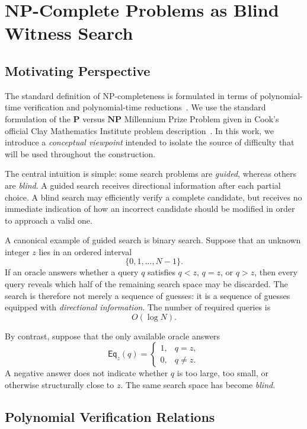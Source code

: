 \documentclass[11pt]{article}
\theoremstyle{plain}
\theoremstyle{definition}
\begin{document}
\section{NP-Complete Problems as Blind Witness Search}
\label{sec:blind-witness-search}

\subsection{Motivating Perspective}

The standard definition of NP-completeness is formulated in terms of
polynomial-time verification and polynomial-time reductions~\cite{Cook1971,Karp1972}.  We use the standard formulation of the $\mathbf{P}$ versus $\mathbf{NP}$ Millennium Prize Problem given in Cook's official Clay Mathematics Institute problem description~\cite{CookClayPvsNP}.  In this work,
we introduce a \emph{conceptual viewpoint} intended to isolate the
source of difficulty that will be used throughout the construction.

The central intuition is simple: some search problems are \emph{guided},
whereas others are \emph{blind}.  A guided search receives directional
information after each partial choice.  A blind search may efficiently verify
a complete candidate, but receives no immediate indication of how an
incorrect candidate should be modified in order to approach a valid one.

A canonical example of guided search is binary search.  Suppose that an
unknown integer \(z\) lies in an ordered interval
\[
    \{0,1,\dots,N-1\}.
\]
If an oracle answers whether a query \(q\) satisfies \(q<z\), \(q=z\), or
\(q>z\), then every query reveals which half of the remaining search space may
be discarded.  The search is therefore not merely a sequence of guesses: it
is a sequence of guesses equipped with \emph{directional information}.  The
number of required queries is
\[
    O(\log N).
\]

By contrast, suppose that the only available oracle answers
\[
    \mathsf{Eq}_z(q)
    =
    \begin{cases}
        1, & q=z,\\
        0, & q\neq z.
    \end{cases}
\]
A negative answer does not indicate whether \(q\) is too large, too small, or
otherwise structurally close to \(z\).  The same search space has become
\emph{blind}.

\subsection{Polynomial Verification Relations}
\end{document}
